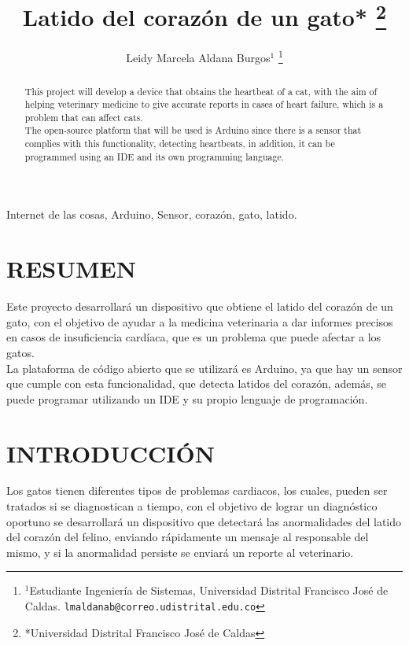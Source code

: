 \documentclass[letterpaper, 10 pt, conference]{ieeeconf}  %
\title{\LARGE \bf
Latido del coraz\'on de un gato*
\thanks{*Universidad Distrital Francisco Jos\'e de Caldas}\\
}
\author{Leidy Marcela Aldana Burgos$^{1}$ %
\thanks{$^{1}$Estudiante Ingenier\'ia de Sistemas,
        Universidad Distrital Francisco Jos\'e de Caldas.
        {\tt\small lmaldanab@correo.udistrital.edu.co}}%
}
\begin{document}
\maketitle
\thispagestyle{empty}
\pagestyle{empty}


\begin{abstract}

This project will develop a device that obtains the heartbeat of a cat, with the aim of helping veterinary medicine to give accurate reports in cases of heart failure, which is a problem that can affect cats.\\

The open-source platform that will be used is Arduino since there is a sensor that complies with this functionality, detecting heartbeats, in addition, it can be programmed using an IDE and its own programming language.\\

\end{abstract}

\begin{keywords}
Internet de las cosas, Arduino, Sensor, coraz\'on, gato, latido.
\end{keywords}

\section*{RESUMEN}

Este proyecto desarrollar\'a un dispositivo que obtiene el latido del coraz\'on de un gato, con el objetivo de ayudar a la medicina veterinaria a dar informes precisos en casos de insuficiencia card\'iaca, que es un problema que puede afectar a los gatos.\\

La plataforma de c\'odigo abierto que se utilizar\'a es Arduino, ya que hay un sensor que cumple con esta funcionalidad, que detecta latidos del coraz\'on, adem\'as, se puede programar utilizando un IDE y su propio lenguaje de programaci\'on.


\section{INTRODUCCI\'ON}

Los gatos tienen diferentes tipos de problemas cardiacos, los cuales, pueden ser tratados si se diagnostican a tiempo, con el objetivo de lograr un diagn\'ostico oportuno se desarrollar\'a un dispositivo que detectar\'a las anormalidades del latido del coraz\'on del felino, enviando r\'apidamente un mensaje al responsable del mismo, y si la anormalidad persiste se enviar\'a un reporte al veterinario.
\\
\end{document}
